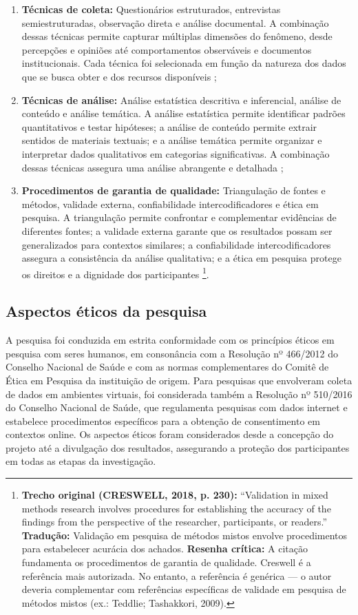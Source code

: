 \begin{enumerate}
    \item \textbf{Técnicas de coleta:} Questionários estruturados, entrevistas semiestruturadas, observação direta e análise documental. A combinação dessas técnicas permite capturar múltiplas dimensões do fenômeno, desde percepções e opiniões até comportamentos observáveis e documentos institucionais. Cada técnica foi selecionada em função da natureza dos dados que se busca obter e dos recursos disponíveis \cite{BARDIN2016};
    \item \textbf{Técnicas de análise:} Análise estatística descritiva e inferencial, análise de conteúdo e análise temática. A análise estatística permite identificar padrões quantitativos e testar hipóteses; a análise de conteúdo permite extrair sentidos de materiais textuais; e a análise temática permite organizar e interpretar dados qualitativos em categorias significativas. A combinação dessas técnicas assegura uma análise abrangente e detalhada \cite{BARDIN2016};
    \item \textbf{Procedimentos de garantia de qualidade:} Triangulação de fontes e métodos, validade externa, confiabilidade intercodificadores e ética em pesquisa. A triangulação permite confrontar e complementar evidências de diferentes fontes; a validade externa garante que os resultados possam ser generalizados para contextos similares; a confiabilidade intercodificadores assegura a consistência da análise qualitativa; e a ética em pesquisa protege os direitos e a dignidade dos participantes \cite{CRESWELL2018}\footnote{\textbf{Trecho original (CRESWELL, 2018, p. 230):} ``Validation in mixed methods research involves procedures for establishing the accuracy of the findings from the perspective of the researcher, participants, or readers.'' \textbf{Tradução:} Validação em pesquisa de métodos mistos envolve procedimentos para estabelecer acurácia dos achados. \textbf{Resenha crítica:} A citação fundamenta os procedimentos de garantia de qualidade. Creswell é a referência mais autorizada. No entanto, a referência é genérica — o autor deveria complementar com referências específicas de validade em pesquisa de métodos mistos (ex.: Teddlie; Tashakkori, 2009).}.
\end{enumerate}

\subsection{Aspectos éticos da pesquisa}
\label{subsec:aspectos_eticos}

A pesquisa foi conduzida em estrita conformidade com os princípios éticos em pesquisa com seres humanos, em consonância com a Resolução nº 466/2012 do Conselho Nacional de Saúde e com as normas complementares do Comitê de Ética em Pesquisa da instituição de origem. Para pesquisas que envolveram coleta de dados em ambientes virtuais, foi considerada também a Resolução nº 510/2016 do Conselho Nacional de Saúde, que regulamenta pesquisas com dados internet e estabelece procedimentos específicos para a obtenção de consentimento em contextos online. Os aspectos éticos foram considerados desde a concepção do projeto até a divulgação dos resultados, assegurando a proteção dos participantes em todas as etapas da investigação.

